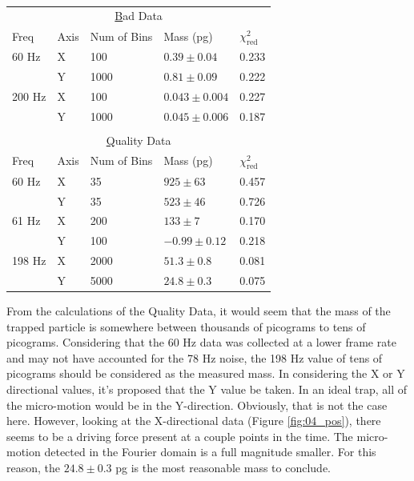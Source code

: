 \documentclass[12pt]{article}
\begin{document}
\begin{table}[ht]
\caption{}
\label{tab:masses}
\centering
\begin{tabular}{lllll}
\multicolumn{5}{c}{{\ul Bad Data}}                                    \\
Freq   & Axis & Num of Bins & Mass (pg)         & $\chi_\text{red}^2$ \\ \hline
60 Hz  & X    & 100         & $0.39 \pm  0.04$  & 0.233               \\
       & Y    & 1000        & $0.81 \pm 0.09$   & 0.222               \\
200 Hz & X    & 100         & $0.043 \pm 0.004$ & 0.227               \\
       & Y    & 1000        & $0.045 \pm 0.006$ & 0.187               \\
       &      &             &                   &                     \\
\multicolumn{5}{c}{{\ul Quality Data}}                                \\
Freq   & Axis & Num of Bins & Mass (pg)         & $\chi_\text{red}^2$ \\ \hline
60 Hz  & X    & 35          & $925 \pm 63$      & 0.457               \\
       & Y    & 35          & $523 \pm 46$      & 0.726               \\
61 Hz  & X    & 200         & $133 \pm 7$       & 0.170               \\
       & Y    & 100         & $-0.99 \pm 0.12$  & 0.218               \\
198 Hz & X    & 2000        & $51.3 \pm 0.8$    & 0.081               \\
       & Y    & 5000        & $24.8 \pm 0.3$    & 0.075              
\end{tabular}
\end{table}

From the calculations of the Quality Data, it would seem that the mass of the trapped particle is somewhere between thousands of picograms to tens of picograms. Considering that the 60 Hz data was collected at a lower frame rate and may not have accounted for the 78 Hz noise, the 198 Hz value of tens of picograms should be considered as the measured mass. In considering the X or Y directional values, it's proposed that the Y value be taken. In an ideal trap, all of the micro-motion would be in the Y-direction. Obviously, that is not the case here. However, looking at the X-directional data (Figure \ref{fig:04_pos}), there seems to be a driving force present at a couple points in the time. The micro-motion detected in the Fourier domain is a full magnitude smaller. For this reason, the $24.8 \pm 0.3$ pg is the most reasonable mass to conclude. 
\end{document}
